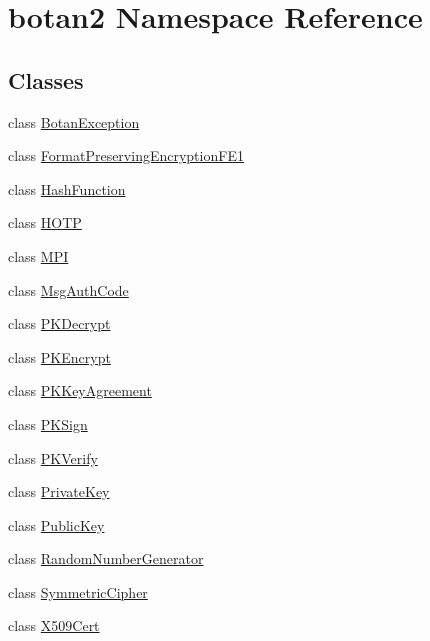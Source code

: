\hypertarget{namespacebotan2}{}\section{botan2 Namespace Reference}
\label{namespacebotan2}
\subsection*{Classes}
\begin{DoxyCompactItemize}
\item 
class \mbox{\hyperlink{classbotan2_1_1_botan_exception}{Botan\+Exception}}
\item 
class \mbox{\hyperlink{classbotan2_1_1_format_preserving_encryption_f_e1}{Format\+Preserving\+Encryption\+F\+E1}}
\item 
class \mbox{\hyperlink{classbotan2_1_1_hash_function}{Hash\+Function}}
\item 
class \mbox{\hyperlink{classbotan2_1_1_h_o_t_p}{H\+O\+TP}}
\item 
class \mbox{\hyperlink{classbotan2_1_1_m_p_i}{M\+PI}}
\item 
class \mbox{\hyperlink{classbotan2_1_1_msg_auth_code}{Msg\+Auth\+Code}}
\item 
class \mbox{\hyperlink{classbotan2_1_1_p_k_decrypt}{P\+K\+Decrypt}}
\item 
class \mbox{\hyperlink{classbotan2_1_1_p_k_encrypt}{P\+K\+Encrypt}}
\item 
class \mbox{\hyperlink{classbotan2_1_1_p_k_key_agreement}{P\+K\+Key\+Agreement}}
\item 
class \mbox{\hyperlink{classbotan2_1_1_p_k_sign}{P\+K\+Sign}}
\item 
class \mbox{\hyperlink{classbotan2_1_1_p_k_verify}{P\+K\+Verify}}
\item 
class \mbox{\hyperlink{classbotan2_1_1_private_key}{Private\+Key}}
\item 
class \mbox{\hyperlink{classbotan2_1_1_public_key}{Public\+Key}}
\item 
class \mbox{\hyperlink{classbotan2_1_1_random_number_generator}{Random\+Number\+Generator}}
\item 
class \mbox{\hyperlink{classbotan2_1_1_symmetric_cipher}{Symmetric\+Cipher}}
\item 
class \mbox{\hyperlink{classbotan2_1_1_x509_cert}{X509\+Cert}}
\end{DoxyCompactItemize}

